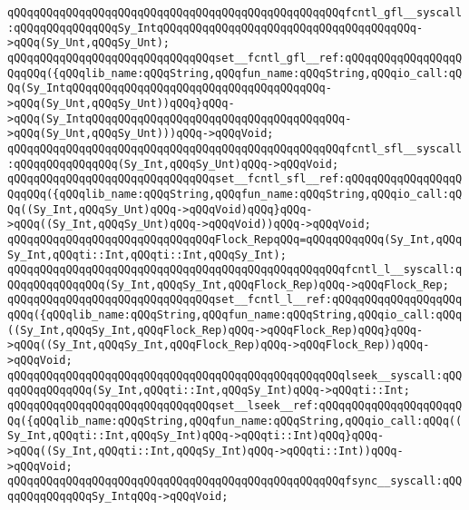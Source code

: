 \newline
\verb|qQQqqQQqqQQqqQQqqQQqqQQqqQQqqQQqqQQqqQQqqQQqqQQqqQQqfcntl_gfl__syscall:qQQqqQQqqQQqqQQqSy_IntqQQqqQQqqQQqqQQqqQQqqQQqqQQqqQQqqQQqqQQq->qQQq(Sy_Unt,qQQqSy_Unt);|\newline
\verb|qQQqqQQqqQQqqQQqqQQqqQQqqQQqqQQqset__fcntl_gfl__ref:qQQqqQQqqQQqqQQqqQQqqQQq({qQQqlib_name:qQQqString,qQQqfun_name:qQQqString,qQQqio_call:qQQq(Sy_IntqQQqqQQqqQQqqQQqqQQqqQQqqQQqqQQqqQQqqQQq->qQQq(Sy_Unt,qQQqSy_Unt))qQQq}qQQq->qQQq(Sy_IntqQQqqQQqqQQqqQQqqQQqqQQqqQQqqQQqqQQqqQQq->qQQq(Sy_Unt,qQQqSy_Unt)))qQQq->qQQqVoid;|\newline
\newline
\verb|qQQqqQQqqQQqqQQqqQQqqQQqqQQqqQQqqQQqqQQqqQQqqQQqqQQqfcntl_sfl__syscall:qQQqqQQqqQQqqQQq(Sy_Int,qQQqSy_Unt)qQQq->qQQqVoid;|\newline
\verb|qQQqqQQqqQQqqQQqqQQqqQQqqQQqqQQqset__fcntl_sfl__ref:qQQqqQQqqQQqqQQqqQQqqQQq({qQQqlib_name:qQQqString,qQQqfun_name:qQQqString,qQQqio_call:qQQq((Sy_Int,qQQqSy_Unt)qQQq->qQQqVoid)qQQq}qQQq->qQQq((Sy_Int,qQQqSy_Unt)qQQq->qQQqVoid))qQQq->qQQqVoid;|\newline
\newline
\verb|qQQqqQQqqQQqqQQqqQQqqQQqqQQqqQQqFlock_RepqQQq=qQQqqQQqqQQq(Sy_Int,qQQqSy_Int,qQQqti::Int,qQQqti::Int,qQQqSy_Int);|\newline
\newline
\verb|qQQqqQQqqQQqqQQqqQQqqQQqqQQqqQQqqQQqqQQqqQQqqQQqqQQqfcntl_l__syscall:qQQqqQQqqQQqqQQq(Sy_Int,qQQqSy_Int,qQQqFlock_Rep)qQQq->qQQqFlock_Rep;|\newline
\verb|qQQqqQQqqQQqqQQqqQQqqQQqqQQqqQQqset__fcntl_l__ref:qQQqqQQqqQQqqQQqqQQqqQQq({qQQqlib_name:qQQqString,qQQqfun_name:qQQqString,qQQqio_call:qQQq((Sy_Int,qQQqSy_Int,qQQqFlock_Rep)qQQq->qQQqFlock_Rep)qQQq}qQQq->qQQq((Sy_Int,qQQqSy_Int,qQQqFlock_Rep)qQQq->qQQqFlock_Rep))qQQq->qQQqVoid;|\newline
\newline
\verb|qQQqqQQqqQQqqQQqqQQqqQQqqQQqqQQqqQQqqQQqqQQqqQQqqQQqlseek__syscall:qQQqqQQqqQQqqQQq(Sy_Int,qQQqti::Int,qQQqSy_Int)qQQq->qQQqti::Int;|\newline
\verb|qQQqqQQqqQQqqQQqqQQqqQQqqQQqqQQqset__lseek__ref:qQQqqQQqqQQqqQQqqQQqqQQq({qQQqlib_name:qQQqString,qQQqfun_name:qQQqString,qQQqio_call:qQQq((Sy_Int,qQQqti::Int,qQQqSy_Int)qQQq->qQQqti::Int)qQQq}qQQq->qQQq((Sy_Int,qQQqti::Int,qQQqSy_Int)qQQq->qQQqti::Int))qQQq->qQQqVoid;|\newline
\newline
\verb|qQQqqQQqqQQqqQQqqQQqqQQqqQQqqQQqqQQqqQQqqQQqqQQqqQQqfsync__syscall:qQQqqQQqqQQqqQQqSy_IntqQQq->qQQqVoid;|\newline
